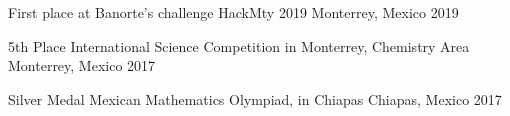 
\begin{cvhonors}

  \cvhonor
    {First place at Banorte's challenge} %
    {HackMty 2019} %
    {Monterrey, Mexico} %
    {2019} %

  \cvhonor
    {5th Place} %
    {International Science Competition in Monterrey, Chemistry Area} %
    {Monterrey, Mexico} %
    {2017} %

  \cvhonor
    {Silver Medal} %
    {Mexican Mathematics Olympiad, in Chiapas} %
    {Chiapas, Mexico} %
    {2017} %

\end{cvhonors}
